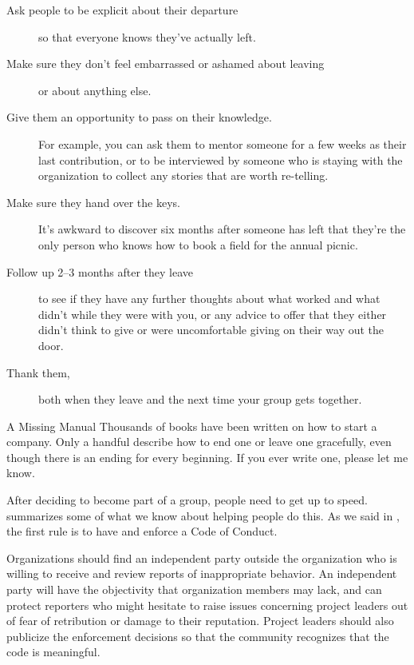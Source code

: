 \begin{description}

\item[Ask people to be explicit about their departure]
  so that everyone knows they've actually left.

\item[Make sure they don't feel embarrassed or ashamed about leaving]
  or about anything else.

\item[Give them an opportunity to pass on their knowledge.]
  For example,
  you can ask them to mentor someone for a few weeks as   their last contribution,
  or to be interviewed by someone who is staying with the organization
  to collect any stories that are worth re-telling.

\item[Make sure they hand over the keys.]
  It's awkward to discover six months after someone has left
  that they're the only person who knows how to book a field for the annual picnic.

\item[Follow up 2--3 months after they leave]
  to see if they have any further thoughts about what worked and what didn't while they were with you,
  or any advice to offer that they either didn't think to give
  or were uncomfortable giving on their way out the door.

\item[Thank them,]
  both when they leave and the next time your group gets together.

\end{description}

\begin{aside}{A Missing Manual}
  Thousands of books have been written on how to start a company.
  Only a handful describe how to end one or leave one gracefully,
  even though there is an ending for every beginning.
  If you ever write one,
  please let me know.
\end{aside}


After deciding to become part of a group,
people need to get up to speed.
\cite{Shol2019} summarizes some of what we know about helping people do this.
As we said in ,
the first rule is to have and enforce a Code of Conduct.

Organizations should find an independent party outside the organization
who is willing to receive and review reports of inappropriate behavior.
An independent party will have the objectivity that organization members may lack,
and can protect reporters who might hesitate to raise issues concerning project leaders
out of fear of retribution or damage to their reputation.
Project leaders should also publicize the enforcement decisions
so that the community recognizes that the code is meaningful.

